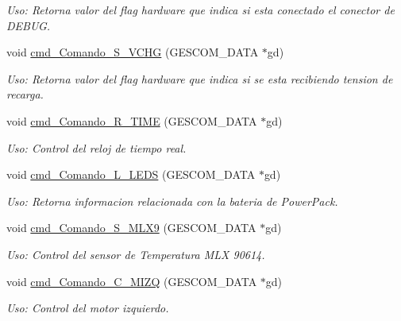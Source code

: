 \begin{DoxyCompactItemize}
\begin{DoxyCompactList}\small\item\em Uso\+: Retorna valor del flag hardware que indica si esta conectado el conector de D\+E\+B\+UG. \end{DoxyCompactList}\item 
void \hyperlink{_gescom___m_e_g_a2560___v3___interfaz_8ino_a2c8e0cf02cde535e4eaff6fb8b7f0adc}{cmd\+\_\+\+Comando\+\_\+\+S\+\_\+\+V\+C\+HG} (G\+E\+S\+C\+O\+M\+\_\+\+D\+A\+TA $\ast$gd)
\begin{DoxyCompactList}\small\item\em Uso\+: Retorna valor del flag hardware que indica si se esta recibiendo tension de recarga. \end{DoxyCompactList}\item 
void \hyperlink{_gescom___m_e_g_a2560___v3___interfaz_8ino_a4bca73c989666a2969dbc1ac7fa94af3}{cmd\+\_\+\+Comando\+\_\+\+R\+\_\+\+T\+I\+ME} (G\+E\+S\+C\+O\+M\+\_\+\+D\+A\+TA $\ast$gd)
\begin{DoxyCompactList}\small\item\em Uso\+: Control del reloj de tiempo real. \end{DoxyCompactList}\item 
void \hyperlink{_gescom___m_e_g_a2560___v3___interfaz_8ino_af1f0e8938dcb96dae770470fbc2ccb8e}{cmd\+\_\+\+Comando\+\_\+\+L\+\_\+\+L\+E\+DS} (G\+E\+S\+C\+O\+M\+\_\+\+D\+A\+TA $\ast$gd)
\begin{DoxyCompactList}\small\item\em Uso\+: Retorna informacion relacionada con la bateria de Power\+Pack. \end{DoxyCompactList}\item 
void \hyperlink{_gescom___m_e_g_a2560___v3___interfaz_8ino_acb509ac66221f928e1aa18fa649176f4}{cmd\+\_\+\+Comando\+\_\+\+S\+\_\+\+M\+L\+X9} (G\+E\+S\+C\+O\+M\+\_\+\+D\+A\+TA $\ast$gd)
\begin{DoxyCompactList}\small\item\em Uso\+: Control del sensor de Temperatura M\+LX 90614. \end{DoxyCompactList}\item 
void \hyperlink{_gescom___m_e_g_a2560___v3___interfaz_8ino_a3489b010361bf072d159295afd7086a7}{cmd\+\_\+\+Comando\+\_\+\+C\+\_\+\+M\+I\+ZQ} (G\+E\+S\+C\+O\+M\+\_\+\+D\+A\+TA $\ast$gd)
\begin{DoxyCompactList}\small\item\em Uso\+: Control del motor izquierdo. \end{DoxyCompactList}\item 

\end{DoxyCompactItemize}
